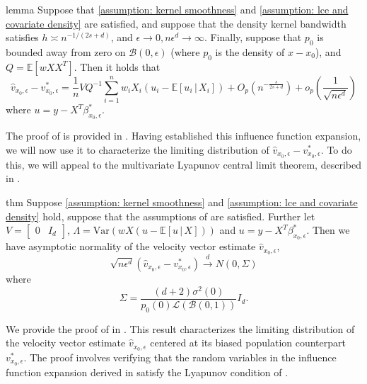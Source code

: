 \documentclass[11pt]{article}
\begin{document}
\begin{restatable}{lemma}{} \label{thm: decomposition for beta}
    Suppose that \cref{assumption: kernel smoothness} and \cref{assumption: lce and covariate density} are satisfied, and suppose that the density kernel bandwidth satisfies $h \asymp n^{-1/(2s+d)}$, and $\epsilon \rightarrow 0, n\epsilon^d \rightarrow \infty$. Finally, suppose that $p_0$ is bounded away from zero on $\mathcal{B}(0, \epsilon)$ (where $p_0$ is the density of $x - x_0$), and $Q = \mathbb{E}[wXX^T]$. Then it holds that
    \[\hat{v}_{x_0, \epsilon} - v^*_{x_0, \epsilon} = \frac{1}{n}VQ^{-1}\sum_{i = 1}^nw_iX_i(u_i - \mathbb{E}[u_i\,|\,X_i]) + O_p\left(n^{-\frac{s}{2s+d}}\right) +o_p\left(\frac{1}{\sqrt{n\epsilon^{d}}}\right)\]
    where $u = y - X^T\beta_{x_0, \epsilon}^*$.
\end{restatable}
The proof of  is provided in . Having established this influence function expansion, we will now use it to characterize the limiting distribution of $\hat{v}_{x_0, \epsilon} - v^*_{x_0, \epsilon}.$ To do this, we will appeal to the multivariate Lyapunov central limit theorem, described in .

\begin{restatable}{thm}{} \label{corr: central limit for v}
    Suppose \cref{assumption: kernel smoothness} and \cref{assumption: lce and covariate density} hold, suppose that the assumptions of  are satisfied. Further let $V = \begin{bmatrix}
        0 & I_d
    \end{bmatrix}$, $\Lambda = \text{Var}(wX(u - \mathbb{E}[u\,|\,X]))$ and $u = y - X^T\beta_{x_0, \epsilon}^*$. Then we have asymptotic normality of the velocity vector estimate $\hat{v}_{x_0, \epsilon}$,
    \[\sqrt{n\epsilon^{d}}(\hat{v}_{x_0, \epsilon} - v^*_{x_0, \epsilon}) \overset{d}{\rightarrow}N(0, \Sigma)\]
    where 
    \[\Sigma = \frac{(d+2)\sigma^2(0)}{p_0(0)\mathcal{L}(\mathcal{B}(0,1))} I_d.\]
\end{restatable}
We provide the proof of  in . This result characterizes the limiting distribution of the velocity vector estimate $\hat v_{x_0, \epsilon}$ centered at its biased population counterpart $v^*_{x_0, \epsilon}$. The proof involves verifying that the random variables in the influence function expansion derived in  satisfy the Lyapunov condition of .
\end{document}
